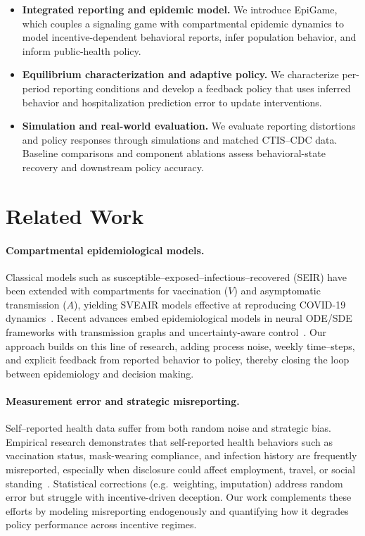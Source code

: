 \documentclass[sigconf,review]{acmart}
\newcommand{\model}{EpiGame}
\begin{document}

\begin{itemize}
    \item \textbf{Integrated reporting and epidemic model.}
    We introduce \model{}, which couples a signaling game with compartmental epidemic
    dynamics to model incentive-dependent behavioral reports, infer population behavior, and inform public-health policy.

    \item \textbf{Equilibrium characterization and adaptive policy.}
    We characterize per-period reporting conditions and develop a feedback policy that uses inferred behavior and hospitalization prediction error to update interventions.

    \item \textbf{Simulation and real-world evaluation.}
    We evaluate reporting distortions and policy responses
    through simulations and matched CTIS--CDC data.
    Baseline comparisons and component ablations assess
    behavioral-state recovery and downstream policy accuracy.
\end{itemize}

\section{Related Work}
\paragraph{Compartmental epidemiological models.} Classical models such as susceptible--exposed--infectious--recovered (SEIR) have been extended with compartments for vaccination ($V$) and asymptomatic transmission ($A$), yielding SVEAIR models effective at reproducing COVID-19 dynamics~\cite{ChoiJTB2020}.
Recent advances embed epidemiological models in neural ODE/SDE frameworks with transmission graphs and uncertainty-aware control~\cite{thiagarajan2022machine,EARTH2025,nSDE2025}.
Our approach builds on this line of research, adding process noise, weekly time--steps, and explicit feedback from reported behavior to policy, thereby closing the loop between epidemiology and decision making.

\paragraph{Measurement error and strategic misreporting.}
Self--reported health data suffer from both random noise and strategic bias.  
Empirical research demonstrates that self-reported health behaviors such as vaccination status, mask-wearing compliance, and infection history are frequently misreported, especially when disclosure could affect employment, travel, or social standing~\cite{Battaglia1997,Merrell2024}.
Statistical corrections (e.g.\ weighting, imputation) address random error but struggle with incentive-driven deception. Our work complements these efforts by modeling misreporting endogenously and quantifying how it degrades policy performance across incentive regimes.
\end{document}
